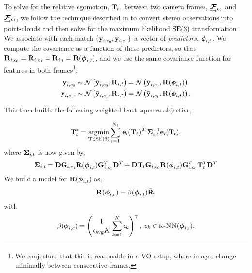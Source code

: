 To solve for the relative egomotion, $\boldsymbol{\mathbf{T}}_t$, between two camera frames, $\underrightarrow{ \boldsymbol{\mathbf{\mathcal{F}}} }_{c_0}$ and $\underrightarrow{ \boldsymbol{\mathbf{\mathcal{F}}} }_{c_1}$, we follow the technique described in  to convert stereo observations into point-clouds and then solve for the maximum likelihood $\mathrm{SE}(3)$ transformation. We associate with each match $\{\boldsymbol{\mathbf{y}}_{i, c_0}, \boldsymbol{\mathbf{y}}_{i, c_1}\}$ a vector of
\emph{predictors}, $\boldsymbol{\mathbf{\phi}}_{i,t}$. We compute the covariance as a function of these predictors, so
that $\boldsymbol{\mathbf{R}}_{i,c_0} =\boldsymbol{\mathbf{R}}_{i,c_1} = \boldsymbol{\mathbf{R}}_{i,t} = \boldsymbol{\mathbf{R}}( \boldsymbol{\mathbf{\phi}}_{i,t})$, and we use the same covariance function for features in both frames\footnote{We conjecture that this is reasonable in a VO setup, where images change minimally between consecutive frames.},
\begin{align}
	\boldsymbol{\mathbf{y}}_{i, c_0} &\sim \mathcal{N}\left(\bar{\boldsymbol{\mathbf{y}}}_{i,c_0}, \boldsymbol{\mathbf{R}}_{i,t} \right) = \mathcal{N}\left(\bar{\boldsymbol{\mathbf{y}}}_{i,c_0}, \boldsymbol{\mathbf{R}}( \boldsymbol{\mathbf{\phi}}_{i,t})\right) \\
		\boldsymbol{\mathbf{y}}_{i, c_1}, &\sim \mathcal{N}\left(\bar{\boldsymbol{\mathbf{y}}}_{i,c_1}, \boldsymbol{\mathbf{R}}_{i,t} \right) = \mathcal{N}\left(\bar{\boldsymbol{\mathbf{y}}}_{i,c_1}, \boldsymbol{\mathbf{R}}( \boldsymbol{\mathbf{\phi}}_{i,t})\right).
\end{align}


This then builds the following weighted least squares objective,

\begin{equation}
\label{eq:vo_objective}
  \boldsymbol{\mathbf{T}}_t^* = \operatorname*{argmin}_{\boldsymbol{\mathbf{T}}\in\text{SE}(3)}\sum_{i=1}^{N_t} 
  \left.{\boldsymbol{\mathbf{e}}_{i}(\boldsymbol{\mathbf{T}}_t)}\right.^T \boldsymbol{\mathbf{\Sigma}}_{i,t}^{-1} \boldsymbol{\mathbf{e}}_{i}(\boldsymbol{\mathbf{T}}_t).
\end{equation}
where $\boldsymbol{\mathbf{\Sigma}}_{i,t}$ is now given by,
\begin{equation}
	\boldsymbol{\mathbf{\Sigma}}_{i,t} = \boldsymbol{\mathbf{D}}\boldsymbol{\mathbf{G}}_{i,c_1} \boldsymbol{\mathbf{R}}( \boldsymbol{\mathbf{\phi}}_{i,t})  \boldsymbol{\mathbf{G}}_{i,c_1}^T \boldsymbol{\mathbf{D}}^T + 
 \boldsymbol{\mathbf{D}}\boldsymbol{\mathbf{T}}_t \boldsymbol{\mathbf{G}}_{i,c_0} \boldsymbol{\mathbf{R}}( \boldsymbol{\mathbf{\phi}}_{i,t}) \boldsymbol{\mathbf{G}}_{i,c_0}^T  \boldsymbol{\mathbf{T}}_t^T \boldsymbol{\mathbf{D}}^T
\end{equation}
We build a model for $\boldsymbol{\mathbf{R}}( \boldsymbol{\mathbf{\phi}}_{i,t})$ as,
\begin{equation}
\boldsymbol{\mathbf{R}}( \boldsymbol{\mathbf{\phi}}_{i,c}) = \beta(\boldsymbol{\mathbf{\phi}}_{i,t}) \bar{\boldsymbol{\mathbf{R}}},
\end{equation}
with
\begin{equation}
 \beta(\boldsymbol{\mathbf{\phi}}_{i,c}) = \left(\frac{1}{\epsilon_\text{avg} K} \sum_{k=1}^K \epsilon_k  \right)^{\gamma}, ~ \epsilon_k \in \textsc{k-NN}(\boldsymbol{\mathbf{\phi}}_{i,t}),
\end{equation}

